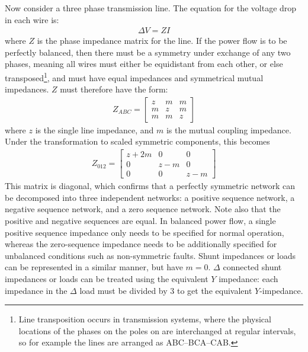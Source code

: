 \documentclass[10pt]{article}
\begin{document}
Now consider a three phase transmission line. The equation for the voltage drop in each wire is:
\begin{align}
	\Delta V = ZI
\end{align}
where $Z$ is the phase impedance matrix for the line. If the power flow is to be perfectly balanced, then there must be a symmetry under exchange of any two phases, meaning all wires must either be equidistant from each other, or else transposed\footnote{Line transposition occurs in transmission systems, where the physical locations of the phases on the poles on are interchanged at regular intervals, so for example the lines are arranged as ABC--BCA--CAB.}, and must have equal impedances and symmetrical mutual impedances. $Z$ must therefore have the form:
\begin{align}
	Z_{ABC} = \left[
			\begin{array}{lll}
				z & m & m \\
				m & z & m \\
				m & m & z
			\end{array}
		\right]
		\label{EQ_ZABC}
\end{align}
where $z$ is the single line impedance, and $m$ is the mutual coupling impedance. Under the transformation to scaled symmetric components, this becomes
\begin{align}
	Z_{012} = \left[
			\begin{array}{lll}
				z+2m & 0 & 0 \\
				0 & z-m & 0 \\
				0 & 0 & z-m
			\end{array}
		\right]
		\label{EQ_Z012}
\end{align}
This matrix is diagonal, which confirms that a perfectly symmetric network can be decomposed into three independent networks: a positive sequence network, a negative sequence network, and a zero sequence network. Note also that the positive and negative sequences are equal. In balanced power flow, a single positive sequence impedance only needs to be specified for normal operation, whereas the zero-sequence impedance needs to be additionally specified for unbalanced conditions such as non-symmetric faults. Shunt impedances or loads can be represented in a similar manner, but have $m = 0$. $\Delta$ connected shunt impedances or loads can be treated using the equivalent $Y$ impedance: each impedance in the $\Delta$ load must be divided by 3 to get the equivalent $Y$-impedance.
\end{document}
